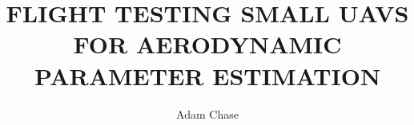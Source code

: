 \documentclass[12pt]{ucthesis}
\title{FLIGHT TESTING SMALL UAVS FOR AERODYNAMIC PARAMETER ESTIMATION}
\author{Adam Chase}
\begin{document}
\maketitle

\begin{frontmatter}
	
	\copyrightpage
	\committeemembershippage

\begin{abstract}

\end{abstract}

\begin{acknowledgements}

\end{acknowledgements}


\tableofcontents


\listoftables

\listoffigures

\printnomenclature

\end{frontmatter}

\pagestyle{plain}

\renewcommand{\baselinestretch}{1.66}










%



\clearpage
\begin{appendices}



%
%

%
\end{appendices}


\clearpage



\end{document}

